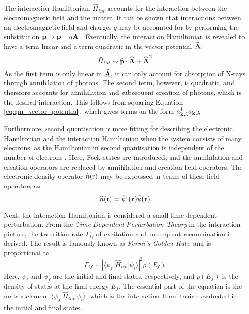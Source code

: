 The interaction Hamiltonian, $\hat{H}_{int}$ accounts for the interaction between the electromagnetic field and the matter.
It can be shown that interactions between an electromagnetic field and charges $q$ may be accounted for by performing the substitution
$\bm{\mathrm{p}} \rightarrow \bm{\mathrm{p}}-q\bm{\mathrm{A}}$ \cite{mcmorrow2011elements}. Eventually, the interaction Hamiltonian is revealed to have a term linear and a term quadratic in the vector potential $\bm{\mathrm{\widehat{A}}}$:
\begin{equation}\label{eq:qm_interaction_Hamiltonian}
    \hat{H}_{int} \sim \bm{\mathrm{\widehat{p}}} \cdot \bm{\mathrm{\widehat{A}}} + \bm{\mathrm{\widehat{A}}}^{2}.
\end{equation}
As the first term is only linear in $\bm{\mathrm{\widehat{A}}}$, it can only account for absorption of X-rays through annihilation of photons.
The second term, however, is quadratic, and therefore accounts for annihilation and subsequent creation of photons, which is the desired interaction.
This follows from squaring Equation \eqref{eq:qm_vector_potential}, which gives terms on the form $a_{\bm{\mathrm{k}},\lambda}^{\dagger} a_{\bm{\mathrm{k}},\lambda}$.

Furthermore, second quantisation is more fitting for describing the electronic Hamiltonian and the interaction Hamiltonian when the system consists of many electrons, as the Hamiltonian in second quantisation is independent of the number of electrons \cite{rohringer2020introduction}.
Here, Fock states are introduced, and the annihilation and creation operators are replaced by annihilation and creation field operators.
The electronic density operator $\widehat{n}(\bm{\mathrm{r}})$ may be expressed in terms of these field operators as
\begin{equation}\label{eq:electronic_density_operator}
    \widehat{n}(\bm{\mathrm{r}}) =  \hat{\psi}^{\dagger}(\bm{\mathrm{r}}) \hat{\psi}( \bm{\mathrm{r}}).
\end{equation}

Next, the interaction Hamiltonian is considered a small time-dependent perturbation.
From the \emph{Time-Dependent Perturbation Theory} in the interaction picture, the transition rate $\Gamma_{if}$ of excitation and subsequent recombination is derived.
The result is famously known as \emph{Fermi's Golden Rule}, and is proportional to
\begin{equation}\label{eq:fermis_golden_rule}
    \Gamma_{if} \sim \left| \langle \psi_{f} | \hat{H}_{int} | \psi_{i} \rangle \right|^{2} \rho(E_{f}).
\end{equation}
Here, $\psi_{i}$ and $\psi_{f}$ are the initial and final states, respectively, and $\rho(E_{f})$ is the density of states at the final energy $E_{f}$.
The essential part of the equation is the matrix element $\langle \psi_{f} | \hat{H}_{int} | \psi_{i} \rangle$, which is the interaction Hamiltonian evaluated in the initial and final states.

